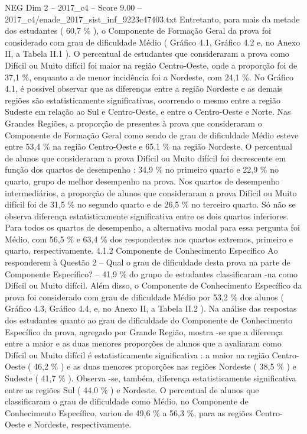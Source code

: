 \begin{textsample}{NEG Dim 2 – 2017\_c4 – Score 9.00 – 2017\_c4/enade\_2017\_sist\_inf\_9223c47403.txt}
Entretanto, para mais da metade dos estudantes ( 60,7 \% ), o Componente de Formação Geral da prova foi considerado com grau de dificuldade Médio ( Gráfico 4.1, Gráfico 4.2 e, no Anexo II, a Tabela II.1 ).
O percentual de estudantes que consideraram a prova como Difícil ou Muito difícil foi maior na região Centro-Oeste, onde a proporção foi de 37,1 \%, enquanto a de menor incidência foi a Nordeste, com 24,1 \%.
No Gráfico 4.1, é possível observar que as diferenças entre a região Nordeste e as demais regiões são estatisticamente significativas, ocorrendo o mesmo entre a região Sudeste em relação ao Sul e Centro-Oeste, e entre o Centro-Oeste e Norte.
Nas Grandes Regiões, a proporção de presentes à prova que consideraram o Componente de Formação Geral como sendo de grau de dificuldade Médio esteve entre 53,4 \% na região Centro-Oeste e 65,1 \% na região Nordeste.
O percentual de alunos que consideraram a prova Difícil ou Muito difícil foi decrescente em função dos quartos de desempenho : 34,9 \% no primeiro quarto e 22,9 \% no quarto, grupo de melhor desempenho na prova.
Nos quartos de desempenho intermediários, a proporção de alunos que consideraram a prova Difícil ou Muito difícil foi de 31,5 \% no segundo quarto e de 26,5 \% no terceiro quarto.
Só não se observa diferença estatisticamente significativa entre os dois quartos inferiores.
Para todos os quartos de desempenho, a alternativa modal para essa pergunta foi Médio, com 56,5 \% e 63,4 \% dos respondentes nos quartos extremos, primeiro e quarto, respectivamente. 4.1.2 Componente de Conhecimento Específico Ao responderem à Questão 2 – Qual o grau de dificuldade desta prova na parte de Componente Específico? – 41,9 \% do grupo de estudantes classificaram -na como Difícil ou Muito difícil.
Além disso, o Componente de Conhecimento Específico da prova foi considerado com grau de dificuldade Médio por 53,2 \% dos alunos ( Gráfico 4.3, Gráfico 4.4, e, no Anexo II, a Tabela II.2 ).
Na análise das respostas dos estudantes quanto ao grau de dificuldade do Componente de Conhecimento Específico da prova, agregado por Grande Região, mostra -se que a diferença entre a maior e as duas menores proporções de alunos que a avaliaram como Difícil ou Muito difícil é estatisticamente significativa : a maior na região Centro-Oeste ( 46,2 \% ) e as duas menores proporções nas regiões Nordeste ( 38,5 \% ) e Sudeste ( 41,7 \% ).
Observa -se, também, diferença estatisticamente significativa entre as regiões Sul ( 44,0 \% ) e Nordeste.
O percentual de alunos que classificaram o grau de dificuldade como Médio, no Componente de Conhecimento Específico, variou de 49,6 \% a 56,3 \%, para as regiões Centro-Oeste e Nordeste, respectivamente.

\end{textsample}
